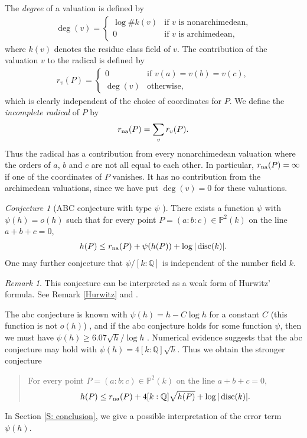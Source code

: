 \documentclass{amsart}
\newcommand\Q{\mathbb{Q}}	\newcommand\R{\mathbb{R}}	\newcommand\C{\mathbb{C}}	\newcommand\bbP{\mathbb{P}}
\theoremstyle{definition}\newtheorem{definition}[theorem]{Definition}
\theoremstyle{remark}\newtheorem{remark}[theorem]{Remark}
\newtheorem{conjecture}[theorem]{Conjecture}
\numberwithin{equation}{section}
\begin{document}
The {\em degree\/} of a valuation is defined by
\begin{gather*}
\deg(v)=\begin{cases}
\log\#k(v)	&\text{if $v$ is nonarchimedean,}\\
0		&\text{if $v$ is archimedean,}
\end{cases}
\end{gather*}
where $k(v)$ denotes the residue class field of $v$.
The contribution of the valuation $v$ to the radical is defined by
\begin{gather*}
r_{v}(P)=\begin{cases}
0	&\text{if }v(a)=v(b)=v(c),\\
\deg(v)	&\text{otherwise,}
\end{cases}
\end{gather*}
which is clearly independent of the choice of coordinates for $P$.
We define the {\em incomplete radical\/} of $P$ by
\begin{gather*}
r_{\textup{na}}(P)=\sum_vr_{v}(P).
\end{gather*}
Thus the radical has a contribution from every nonarchimedean valuation where the orders of $a$,
$b$ and $c$ are not all equal to each other.
In particular,
$r_{\textup{na}}(P)=\infty$ if one of the coordinates of $P$ vanishes.
It has no contribution from the archimedean valuations,
since we have put $\deg(v)=0$ for these valuations.

\begin{conjecture}[ABC conjecture with type $\psi$ \cite{Oesterle,abcrvhi,VojtaABC}]
\label{C: abc}
There exists a function $\psi$ with $\psi (h)=o(h)$ such that for every point $P=(a:b:c)\in\bbP^2( k)$ on the line $a+b+c=0$,
\begin{gather*}
h(P)\leq r_{\textup{na}}(P)+\psi(h(P))+\log|\operatorname{disc}(k)|.
\end{gather*}
One may further conjecture that $\psi/[k:\Q]$ is independent of the number field $k$.
\end{conjecture}

\begin{remark}
This conjecture can be interpreted as a weak form of Hurwitz' formula.
See Remark \ref{Hurwitz} and \cite{Smirnov}.
\end{remark}

The abc conjecture is known with $\psi(h)=h-C\log h$ for a constant $C$ (this function is not $o(h)$) \cite{ST,SYu},
and if the abc conjecture holds for some function $\psi$,
then we must have $\psi(h)\geq 6.07{\sqrt{h}}/{\log h}$ \cite{ST,lowerbound}.
Numerical evidence suggests that the abc conjecture may hold with $\psi(h)=4[k:\Q]\sqrt h$.
Thus we obtain the stronger conjecture
\begin{quote}
For every point $P=(a:b:c)\in\bbP^2( k)$ on the line $a+b+c=0$,
$$
h(P)\leq r_\na(P)+4[k:\Q]\sqrt{h(P)}+\log|\disc(k)|.
$$
\end{quote}
In Section \ref{S: conclusion},
we give a possible interpretation of the error term $\psi(h)$.\medskip
\end{document}
